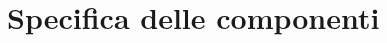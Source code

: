 \documentclass[../DefinizioneDiProdotto.tex]{subfiles}
\begin{document}
		\section{Specifica delle componenti}
\end{document}
